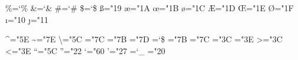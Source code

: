 
\outer{}

\rootme


\def\`#1{{\accent18 #1}}
\def\'#1{{\accent19 #1}}
\def\v#1{{\accent20 #1}}
\def\u#1{{\accent21 #1}}
\def\=#1{{\accent22 #1}}
\def\°#1{{\accent23 #1}}
\def\^#1{{\accent94 #1}}
\def\.#1{{\accent95 #1}}
\def\H#1{{\accent"7D #1}}
\def\~#1{{\accent"7E #1}}
\def\"#1{{\accent"7F #1}}
\def\t#1{{\edef\next{\the\font}\the\textfont1\accent"7F\next#1}}

\chardef\%=`\%
\chardef\&=`\&
\chardef\#=`\#
\chardef\$=`\$
\chardef\ss="19
\chardef\ae="1A
\chardef\oe="1B
\chardef\o="1C
\chardef\AE="1D
\chardef\OE="1E
\chardef\O="1F
\chardef\i="10 \chardef\j="11 %
\def\l{\char32l}
\def\L{\unhbox\voidb@x\setbox0\hbox{L}\hbox to \wd0{\hss\char32L}}
\def\SS{SS}

\def\d#1{{\o@lign{\relax#1\crcr\hidewidth\sh@ft{-1ex}.\hidewidth}}} %
\def\b#1{{\o@lign{\relax#1\crcr\hidewidth\sh@ft{-3ex}%
    \vbox to.2ex{\hbox{\char22}\vss}\hidewidth}}}
\def\c#1{{\setbox\z@\hbox{#1}\ifdim\ht\z@=1ex\accent24 #1%
  \else\ooalign{\unhbox\z@\crcr\hidewidth\char24\hidewidth}\fi}}
\def\copyright{{\ooalign{\hfil\raise.07ex\hbox{c}\hfil\crcr\Orb}}}

\chardef\textasciicircum="5E %
\chardef\textasciitilde="7E %
\chardef\textbackslash="5C %
\chardef\textbar="7C %
\chardef\textbraceleft="7B %
\chardef\textbraceright="7D %
\chardef\textdollar=`\$
\chardef\textendash="7B %
\chardef\textemdash="7C %
\chardef\textexclamdown="3C %
\chardef\textquestiondown="3E %
\chardef\textgreater="3C %
\chardef\textless="3E %
\chardef\textquotedblleft="5C %
\chardef\textquotedblright="22 %
\chardef\textquoteleft="60 %
\chardef\textquoteright="27 %
\def\textregistered{{\ooalign{\hfil\raise.07ex\hbox{\the\scriptfont0 R}\hfil\crcr\Orb}}}
\def\texttrademark{{\raise.5ex\hbox{\the\scriptfont0 TM}}}
\chardef\textunderscore=`\_ %
\chardef\textvisiblespace="20 %

\ifnum{} \endinput\fi


